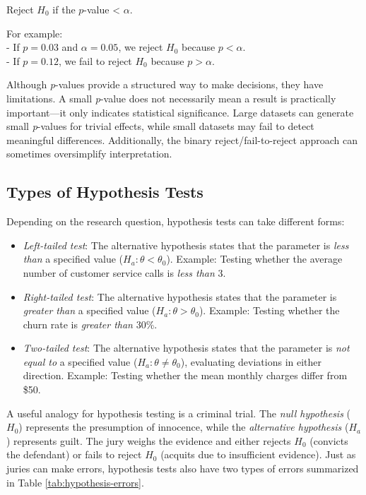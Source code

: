 \documentclass[
  11pt,
]{book}
\providecommand{\tightlist}{%
  \setlength{\itemsep}{0pt}\setlength{\parskip}{0pt}}
\theoremstyle{definition}
\theoremstyle{definition}
\theoremstyle{definition}
\theoremstyle{definition}
\theoremstyle{remark}
\begin{document}
Reject \(H_0\) if the \(p\)-value \textless{} \(\alpha\).

For example:\\
- If \(p = 0.03\) and \(\alpha = 0.05\), we reject \(H_0\) because \(p < \alpha\).\\
- If \(p = 0.12\), we fail to reject \(H_0\) because \(p > \alpha\).

Although \emph{p}-values provide a structured way to make decisions, they have limitations. A small \emph{p}-value does not necessarily mean a result is practically important---it only indicates statistical significance. Large datasets can generate small \emph{p}-values for trivial effects, while small datasets may fail to detect meaningful differences. Additionally, the binary reject/fail-to-reject approach can sometimes oversimplify interpretation.

\subsection{Types of Hypothesis Tests}\label{types-of-hypothesis-tests}

Depending on the research question, hypothesis tests can take different forms:

\begin{itemize}
\tightlist
\item
  \emph{Left-tailed test}: The alternative hypothesis states that the parameter is \emph{less than} a specified value (\(H_a: \theta < \theta_0\)). Example: Testing whether the average number of customer service calls is \emph{less than} 3.\\
\item
  \emph{Right-tailed test}: The alternative hypothesis states that the parameter is \emph{greater than} a specified value (\(H_a: \theta > \theta_0\)). Example: Testing whether the churn rate is \emph{greater than} 30\%.\\
\item
  \emph{Two-tailed test}: The alternative hypothesis states that the parameter is \emph{not equal to} a specified value (\(H_a: \theta \neq \theta_0\)), evaluating deviations in either direction. Example: Testing whether the mean monthly charges differ from \$50.
\end{itemize}

A useful analogy for hypothesis testing is a criminal trial. The \emph{null hypothesis} (\(H_0\)) represents the presumption of innocence, while the \emph{alternative hypothesis} (\(H_a\)) represents guilt. The jury weighs the evidence and either rejects \(H_0\) (convicts the defendant) or fails to reject \(H_0\) (acquits due to insufficient evidence). Just as juries can make errors, hypothesis tests also have two types of errors summarized in Table \ref{tab:hypothesis-errors}.
\end{document}
